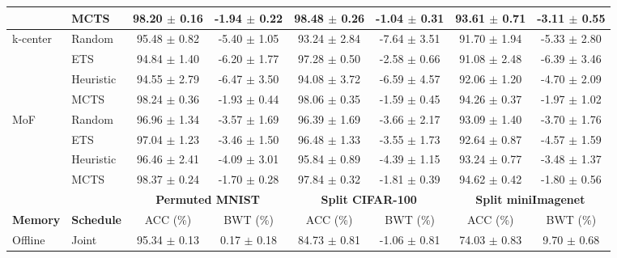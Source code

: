 \begin{tabular}{llcccccc}
	& MCTS            & 98.20 $\pm$ 0.16      & -1.94 $\pm$ 0.22     & 98.48 $\pm$ 0.26         & -1.04 $\pm$ 0.31         & 93.61 $\pm$ 0.71       & -3.11 $\pm$ 0.55       \\ \midrule
	\multirow{4}{*}{k-center} & Random          & 95.48 $\pm$ 0.82      & -5.40 $\pm$ 1.05     & 93.24 $\pm$ 2.84         & -7.64 $\pm$ 3.51         & 91.70 $\pm$ 1.94       & -5.33 $\pm$ 2.80       \\
	& ETS             & 94.84 $\pm$ 1.40      & -6.20 $\pm$ 1.77     & 97.28 $\pm$ 0.50         & -2.58 $\pm$ 0.66         & 91.08 $\pm$ 2.48       & -6.39 $\pm$ 3.46       \\
	& Heuristic         & 94.55 $\pm$ 2.79      & -6.47 $\pm$ 3.50     & 94.08 $\pm$ 3.72         & -6.59 $\pm$ 4.57         & 92.06 $\pm$ 1.20       & -4.70 $\pm$ 2.09       \\
	& MCTS            & 98.24 $\pm$ 0.36      & -1.93 $\pm$ 0.44     & 98.06 $\pm$ 0.35         & -1.59 $\pm$ 0.45         & 94.26 $\pm$ 0.37       & -1.97 $\pm$ 1.02       \\ \midrule
	\multirow{4}{*}{MoF}             & Random          & 96.96 $\pm$ 1.34      & -3.57 $\pm$ 1.69     & 96.39 $\pm$ 1.69         & -3.66 $\pm$ 2.17         & 93.09 $\pm$ 1.40       & -3.70 $\pm$ 1.76       \\
	& ETS             & 97.04 $\pm$ 1.23      & -3.46 $\pm$ 1.50     & 96.48 $\pm$ 1.33         & -3.55 $\pm$ 1.73         & 92.64 $\pm$ 0.87       & -4.57 $\pm$ 1.59       \\
	& Heuristic         & 96.46 $\pm$ 2.41      & -4.09 $\pm$ 3.01     & 95.84 $\pm$ 0.89         & -4.39 $\pm$ 1.15         & 93.24 $\pm$ 0.77       & -3.48 $\pm$ 1.37       \\
	& MCTS            & 98.37 $\pm$ 0.24      & -1.70 $\pm$ 0.28     & 97.84 $\pm$ 0.32         & -1.81 $\pm$ 0.39         & 94.62 $\pm$ 0.42       & -1.80 $\pm$ 0.56       \\ 
	\bottomrule
	\toprule
	&         & \multicolumn{2}{c}{\textbf{Permuted MNIST}} & \multicolumn{2}{c}{\textbf{Split CIFAR-100}} & \multicolumn{2}{c}{\textbf{Split miniImagenet}} \\ \midrule 
	\textbf{Memory}                 & \textbf{Schedule}  & ACC (\%)        & BWT (\%)         & ACC (\%)         & BWT (\%)         & ACC (\%)          & BWT (\%)           \\ \midrule 
	Offline                   & Joint   & 95.34 $\pm$ 0.13  & 0.17 $\pm$ 0.18    & 84.73 $\pm$ 0.81   & -1.06 $\pm$ 0.81   & 74.03 $\pm$ 0.83    & 9.70 $\pm$ 0.68      \\ \midrule 

\end{tabular}
